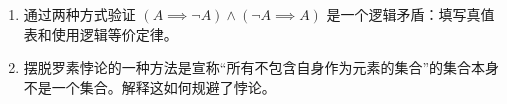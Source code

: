 \begin{enumerate}
    \item 
    通过两种方式验证 $(A \implies {\lnot}A) \land ({\lnot}A \implies A)$ 是一个逻辑矛盾：填写真值表和使用逻辑等价定律。
    
    \wbvfill
     
     
    \item 
    摆脱罗素悖论的一种方法是宣称“所有不包含自身作为元素的集合”的集合本身不是一个集合。解释这如何规避了悖论。
    
    
    \wbvfill
     
     \workbookpagebreak
     
    \end{enumerate}
    
    
